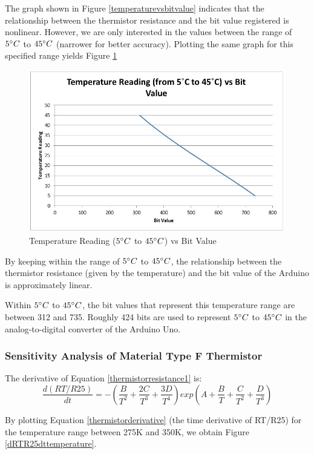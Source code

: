 The graph shown in Figure \ref{temperaturevsbitvalue} indicates that the relationship between the thermistor resistance and the bit value registered is nonlinear. However, we are only interested in the values between the range of $5\degree C$ to $45\degree C$ (narrower for better accuracy). Plotting the same graph for this specified range yields Figure \ref{temperaturevsbitvalue5-45} 

\begin{figure}[H]
	\centering
	\includegraphics[width=0.8\linewidth]{thermistor3.jpg}
	\caption{Temperature Reading ($5\degree C$ to $45\degree C$) vs Bit Value}
	\label{temperaturevsbitvalue5-45}
\end{figure}

By keeping within the range of $5\degree C$ to $45\degree C$, the relationship between the thermistor resistance (given by the temperature) and the bit value of the Arduino is approximately linear.

Within $5\degree C$ to $45\degree C$, the bit values that represent this temperature range are between 312 and 735. Roughly 424 bits are used to represent $5\degree C$ to $45\degree C$ in the analog-to-digital converter of the Arduino Uno. 

\subsubsection{Sensitivity Analysis of Material Type F Thermistor}

The derivative of Equation \ref{thermistorresistance1} is: 
\begin{equation}
	\frac{d(RT/R25)}{dt}=-\left (\frac{B}{T^2}+\frac{2C}{T^3}+\frac{3D}{T^4} \right ) exp(A+\frac{B}{T}+\frac{C}{T^2}+\frac{D}{T^3}) 
	\label{thermistorderivative}
\end{equation}

By plotting Equation \ref{thermistorderivative} (the time derivative of RT/R25) for the temperature range between 275K and 350K, we obtain Figure \ref{dRTR25dttemperature}. 

